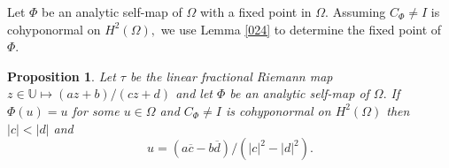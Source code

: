 \documentclass[11pt]{amsart}%
\newtheorem{pps}[thm]{Proposition}
\theoremstyle{definition}
\theoremstyle{remark}
\numberwithin{equation}{section}
\begin{document}





Let $\Phi$ be an analytic self-map of $\Omega$ with a fixed point in $\Omega.$
Assuming $C_{\Phi}\neq I$ is cohyponormal on $H^{2}(\Omega),$ we use Lemma
\ref{024} to determine the fixed point of $\Phi.$

\begin{pps}
\label{081} Let $\tau$ be the linear fractional Riemann map $z\in \mathbb{U} \mapsto (az+b)/(cz+d)$  and let $\Phi$ be an analytic self-map of $\Omega.$ If
$\Phi(u)=u$ for some $u\in\Omega$ and $C_{\Phi}\neq I$ is cohyponormal on
$H^{2}(\Omega)$ then $|c|<|d|$ and
\[
u=(a\overline{c}-b\overline{d})/(|c|^{2}-|d|^{2}).
\]

\end{pps}
\end{document}
